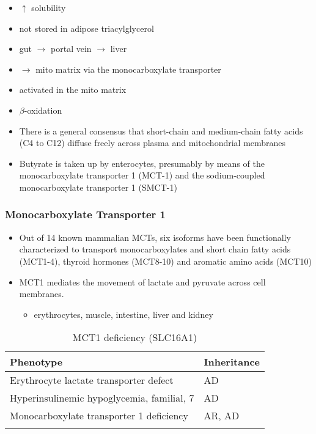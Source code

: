 \documentclass{scrartcl}
\begin{document}
\begin{itemize}
\item \(\uparrow\) solubility
\item not stored in adipose triacylglycerol
\item gut \(\to\) portal vein \(\to\) liver
\item \(\to\) mito matrix via the monocarboxylate transporter
\item activated in the mito matrix
\item \(\beta\)-oxidation

\item There is a general consensus that short-chain and medium-chain fatty
acids (C4 to C12) diffuse freely across plasma and mitochondrial
membranes
\item Butyrate is taken up by enterocytes, presumably by means of the
monocarboxylate transporter 1 (MCT-1) and the sodium-coupled
monocarboxylate transporter 1 (SMCT-1)
\end{itemize}

\subsubsection{Monocarboxylate Transporter 1}
\label{sec:orgbc947d3}
\begin{itemize}
\item Out of 14 known mammalian MCTs, six isoforms have been functionally
characterized to transport monocarboxylates and short chain fatty
acids (MCT1-4), thyroid hormones (MCT8-10) and aromatic amino
acids (MCT10)

\item MCT1 mediates the movement of lactate and pyruvate across cell
membranes.
\begin{itemize}
\item erythrocytes, muscle, intestine, liver and kidney
\end{itemize}
\end{itemize}

\begin{table}[htbp]
\caption[Monocarboxylate Transporter 1]{\label{tab:org874da6c}
MCT1 deficiency (SLC16A1)}
\centering
\begin{tabular}{ll}
Phenotype & Inheritance\\
\hline
Erythrocyte lactate transporter defect & AD\\
Hyperinsulinemic hypoglycemia, familial, 7\footnotemark & AD\\
Monocarboxylate transporter 1 deficiency & AR, AD\\
 & \\
\end{tabular}
\end{table}
\end{document}
